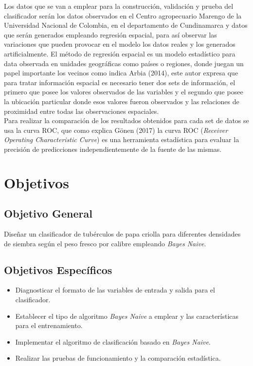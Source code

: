 Los datos que se van a emplear para la construcción, validación y prueba del clasificador serán los datos observados en el Centro agropecuario Marengo de la Universidad Nacional de Colombia, en el departamento de Cundinamarca y datos que serán generados empleando regresión espacial, para así observar las variaciones que pueden provocar en el modelo los datos reales y los generados artificialmente. El método de regresión espacial es un modelo estadístico para data observada en unidades geográficas como países o regiones, donde juegan un papel importante los vecinos como indica Arbia (2014), este autor expresa que para tratar información espacial es necesario tener dos sets de información, el primero que posee los valores observados de las variables y el segundo que posee la ubicación particular donde esos valores fueron observados y las relaciones de proximidad entre todas las observaciones espaciales.\\

Para realizar la comparación de los resultados obtenidos para cada set de datos se usa la curva ROC, que como explica Gönen (2017) la curva ROC (\textit{Receiver Operating Characteristic Curve}) es una herramienta estadística para evaluar la precisión de predicciones independientemente de la fuente de las mismas.

\section{Objetivos}

\subsection{Objetivo General}

Diseñar un clasificador de tubérculos de papa criolla para diferentes densidades de siembra según el peso fresco por calibre empleando \textit{Bayes Naive}.

\subsection{Objetivos Espec\'ificos}
 
\begin{itemize}
\item  Diagnosticar el formato de las variables de entrada y salida para el clasificador.
\item	 Establecer el tipo de algoritmo \textit{Bayes Naive} a emplear  y las características para el entrenamiento.
\item  Implementar el algoritmo de clasificación basado en \textit{Bayes Naive}.
\item  Realizar las pruebas de funcionamiento y la comparación estadística.
\end{itemize}

